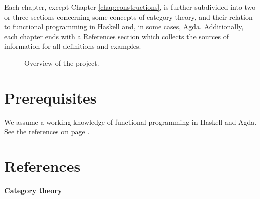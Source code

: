 Each chapter, except Chapter \ref{chap:constructions}, is further
subdivided into two or three sections concerning some concepts of
category theory, and their relation to functional programming in
Haskell and, in some cases, Agda. Additionally, each chapter ends with
a References section which collects the sources of information for all
definitions and examples.

\begin{figure}[htb]
  \begin{center}
  \end{center}
  \caption{Overview of the project.}
  \label{fig:overview}
\end{figure}

\section*{Prerequisites}

We assume a working knowledge of functional programming in Haskell and
Agda. See the references on page
\pageref{sec:introduction-references}.

\section*{References}
\label{sec:introduction-references}

\paragraph{Category theory}

